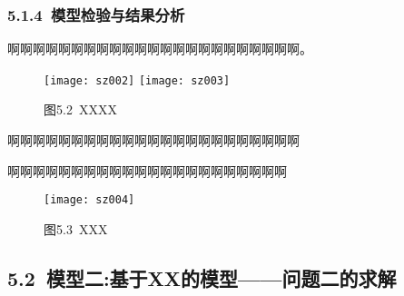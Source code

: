 \documentclass[12pt,a4paper]{article}
\begin{document}
\subsubsection*{5.1.4\ 模型检验与结果分析}
\begin{spacing}{1.0}
	\sloppy{}
	啊啊啊啊啊啊啊啊啊啊啊啊啊啊啊啊啊啊啊啊啊啊啊。
\end{spacing}
\begin{figure}[htbp]
	\centering
	\texttt{[image: sz002]}\quad
	\texttt{[image: sz003]}\quad
	
	\caption*{图5.2\ XXXX}%
\end{figure}
\begin{spacing}{1.0}
	\sloppy{}
	啊啊啊啊啊啊啊啊啊啊啊啊啊啊啊啊啊啊啊啊啊啊啊
\end{spacing}%
\vspace{+0.5em}%
\begin{spacing}{1.0}
	\sloppy{}
	啊啊啊啊啊啊啊啊啊啊啊啊啊啊啊啊啊啊啊啊啊啊
\end{spacing}
\begin{figure}[htbp] %
	\centering\texttt{[image: sz004]} %
	\caption*{图5.3\ XXX}
\end{figure}

\subsection*{5.2\ 模型二:基于XX的模型——问题二的求解}
\end{document}
